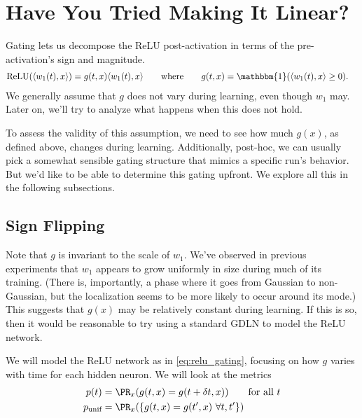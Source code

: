 \documentclass{article}
\begin{document}
\section{Have You Tried Making It Linear?}

Gating lets us decompose the ReLU post-activation in terms of the pre-activation's sign and magnitude.
\begin{align}
  \text{ReLU}(\langle w_1(t), x \rangle)
  &= g(t, x) \langle w_1(t), x \rangle \qquad \text{where} \qquad g(t, x) = \mathbbm{1}( \langle w_1(t), x \rangle \geq 0 ). \label{eq:relu_gating}
\end{align}
We generally assume that $g$ does not vary during learning, even though $w_1$ may.
Later on, we'll try to analyze what happens when this does not hold.

To assess the validity of this assumption, we need to see how much $g(x)$, as defined above, changes during learning.
Additionally, post-hoc, we can usually pick a somewhat sensible gating structure that mimics a specific run's behavior.
But we'd like to be able to determine this gating upfront.
We explore all this in the following subsections.

\subsection{Sign Flipping}

Note that $g$ is invariant to the scale of $w_1$.
We've observed in previous experiments that $w_1$ appears to grow uniformly in size during much of its training.
(There is, importantly, a phase where it goes from Gaussian to non-Gaussian, but the localization seems to be more likely to occur around its mode.)
This suggests that $g(x)$ may be relatively constant during learning.
If this is so, then it would be reasonable to try using a standard GDLN to model the ReLU network.

We will model the ReLU network as in \cref{eq:relu_gating}, focusing on how $g$ varies with time for each hidden neuron.
We will look at the metrics
\begin{align}
  p(t) &= \PR_x( g(t, x) = g(t + \delta t, x) ) \qquad \text{for all $t$} \\
  p_{\text{unif}} &= \PR_x( \{ g(t, x) = g(t', x) \ \forall t,t' \} )
\end{align}
\end{document}
